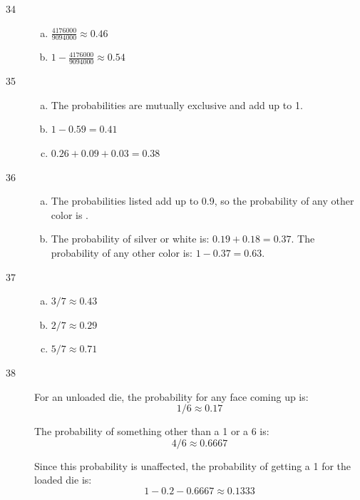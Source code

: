 \documentclass[letterpaper]{exam}
\begin{document}
\begin{description}
      \item[34]
        \begin{enumerate}[(a)]
          \item $\frac{\num{ 4 176 000 }}{\num{ 9 094 000 }} \approx \boxed{ 0.46 }$
          \item $1 - \frac{\num{ 4 176 000 }}{\num{ 9 094 000 }} \approx \boxed{ 0.54 }$
        \end{enumerate}

      \item[35]
        \begin{enumerate}[(a)]
          \item The probabilities are mutually exclusive and add up to 1.
          \item $1 - 0.59 = \boxed{ 0.41 }$
          \item $0.26 + 0.09 + 0.03 = \boxed{ 0.38 }$
        \end{enumerate}

      \item[36]
        \begin{enumerate}[(a)]

          \item The probabilities listed add up to 0.9, so the probability of
            any other color is .

          \item The probability of silver or white is: $0.19 + 0.18 = 0.37$. The
            probability of any other color is: $1 - 0.37 = \boxed{ 0.63 }$.

        \end{enumerate}

      \item[37]
        \begin{enumerate}[(a)]
          \item $3/7 \approx \boxed{ 0.43 } $
          \item $2/7 \approx \boxed{ 0.29 } $
          \item $5/7 \approx \boxed{ 0.71 } $
        \end{enumerate}

      \item[38]
        For an unloaded die, the probability for any face coming up is:
        \[
          1/6 \approx 0.17
        \]

        The probability of something other than a 1 or a 6 is:
        \[
          4/6 \approx 0.6667
        \]

        Since this probability is unaffected, the probability of getting a 1 for
        the loaded die is:
        \[
          1 - 0.2 - 0.6667 \approx 0.1333
        \]


\end{description}
\end{document}
